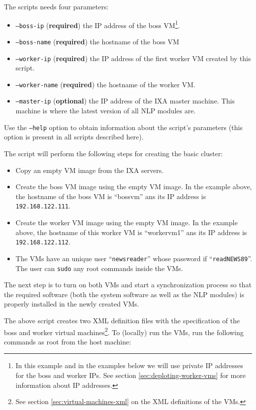 \documentclass[a4]{article}
\begin{document}
\noindent The scripts needs four parameters:
\begin{itemize}
\item \texttt{--boss-ip} (\textbf{required}) the IP address of the boss
  VM\footnote{In this example and in the examples below we will use private
    IP addresses for the boss and worker IPs. See section
    \ref{sec:deploting-worker-vms} for more information about IP
    addresses.}.
\item \texttt{--boss-name} (\textbf{required}) the hostname of the boss VM
\item \texttt{--worker-ip} (\textbf{required}) the IP address of the first
  worker VM created by this script.
\item \texttt{--worker-name} (\textbf{required}) the hostname of the worker
  VM.
\item \texttt{--master-ip} (\textbf{optional}) the IP address of the IXA
  master machine. This machine is where the latest version of all NLP
  modules are.
\end{itemize}

Use the \texttt{--help} option to obtain information about the script's
parameters (this option is present in all scripts described here).

The script will perform the following steps for creating the basic cluster:
\begin{itemize}
\item Copy an empty VM image from the IXA servers.
\item Create the boss VM image using the empty VM image. In the example
  above, the hostname of the boss VM is ``\textrm{bossvm}'' ans its IP
  address is \texttt{192.168.122.111}.
\item Create the worker VM image using the empty VM image.  In the example
  above, the hostname of this worker VM is ``\textrm{workervm1}'' ans its IP
  address is \texttt{192.168.122.112}.
\item The VMs have an unique user ``\texttt{newsreader}'' whose password if
  ``\texttt{readNEWS89}''. The user can \texttt{sudo} any root commands
  inside the VMs.
\end{itemize}

The next step is to turn on both VMs and start a synchronization process so
that the required software (both the system software as well as the NLP
modules) is properly installed in the newly created VMs.

The above script creates two XML definition files with the specification of
the boss and worker virtual machines\footnote{See section \ref{sec:virtual-machines-xml} on the XML
  definitions of the VMs.}. To (locally) run the VMs, run the following
commands as root from the host machine:
\end{document}

